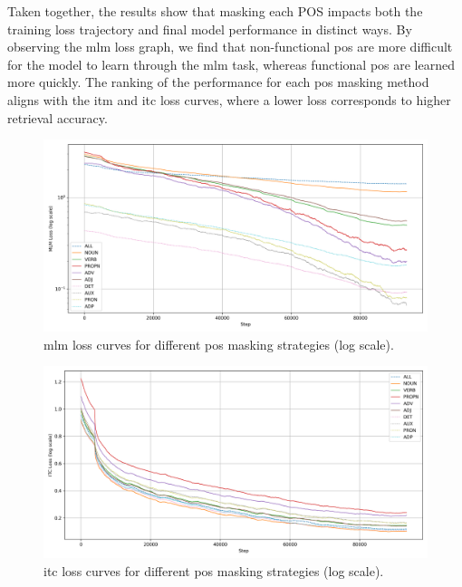 Taken together, the results show that masking each POS impacts both the training loss trajectory and final model performance in distinct ways.  
By observing the \acrshort{mlm} loss graph, we find that non-functional \acrshort{pos} are more difficult for the model to learn through the \acrshort{mlm} task, whereas functional \acrshort{pos} are learned more quickly.
The ranking of the performance for each \acrshort{pos} masking method aligns with the \acrshort{itm} and \acrshort{itc} loss curves, where a lower loss corresponds to higher retrieval accuracy.

\begin{figure}[H]
    \caption{\acrshort{mlm} loss curves for different \acrshort{pos} masking strategies (log scale).}
    \label{fig:mlm_loss_pretrain}
    \centering
    \includegraphics[width=\textwidth]{Images/graph/mlm.png}
\end{figure}

\begin{figure}[H]
    \caption{\acrshort{itc} loss curves for different \acrshort{pos} masking strategies (log scale).}
    \label{fig:itc_loss_pretrain}
    \centering
    \includegraphics[width=\textwidth]{Images/graph/itc.png}
\end{figure}

